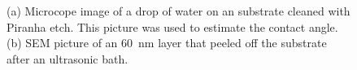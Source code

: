 \begin{figure}[tp]
	\begin{subfigure}[t]{ 0.49\linewidth}
		\caption{}\label{subfig::wetting}
		\centering
	\end{subfigure}
	\hfill
	\begin{subfigure}[t]{ 0.49\linewidth}
		\caption{}\label{subfig::peeled_ir}
		\centering
	\end{subfigure}
	\caption{(a) Microcope image of a drop of water on an \ir substrate cleaned with Piranha etch. This picture was used to estimate the contact angle. (b) SEM picture of an \SI{60}{nm} \ir layer that peeled off the substrate after an ultrasonic bath.}
	\label{fig::sem_substrates}
\end{figure}

